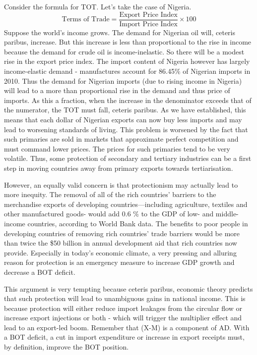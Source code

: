 Consider the formula for TOT. Let's take the case of Nigeria.
$$\textrm{Terms of Trade}=\frac{\textrm{Export Price Index}}{\textrm{Import Price Index}}×100$$
Suppose the world's income grows. The demand for Nigerian oil will, ceteris paribus, increase. But this increase is less than proportional to the rise in income because the demand for crude oil is income-inelastic. So there will be a modest rise in the export price index. The import content of Nigeria however has largely income-elastic demand - manufactures account for 86.45\% of Nigerian imports in 2010. Thus the demand for Nigerian imports (due to rising income in Nigeria) will lead to a more than proportional rise in the demand and thus price of imports. As this a fraction, when the increase in the denominator exceeds that of the numerator, the TOT must fall, ceteris paribus. As we have established, this means that each dollar of Nigerian exports can now buy less imports and may lead to worsening standards of living. This problem is worsened by the fact that such primaries are sold in markets that approximate perfect competition and must command lower prices. The prices for such primaries tend to be very volatile. Thus, some protection of secondary and tertiary industries can be a first step in moving countries away from primary exports towards tertiarisation.

However, an equally valid concern is that protectionism may actually lead to more inequity. The removal of all of the rich countries' barriers to the merchandise exports of developing countries—including agriculture, textiles and other manufactured goods- would add 0.6 \% to the GDP of low- and middle-income countries, according to World Bank data. The benefits to poor people in developing countries of removing rich countries' trade barriers would be more than twice the \$50 billion in annual development aid that rich countries now provide. Especially in today's economic climate, a very pressing and alluring reason for protection is an emergency measure to increase GDP growth and decrease a BOT deficit.

This argument is very tempting because ceteris paribus, economic theory predicts that such protection will lead to unambiguous gains in national income. This is because protection will either reduce import leakages from the circular flow or increase export injections or both - which will trigger the multiplier effect and lead to an export-led boom. Remember that (X-M) is a component of AD. With a BOT deficit, a cut in import expenditure or increase in export receipts must, by definition, improve the BOT position.

